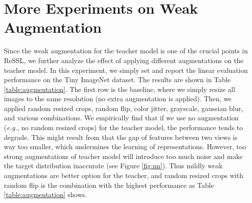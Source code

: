 \documentclass{article}
\newcommand{\<}{\left\langle}
\renewcommand{\>}{\right\rangle}
\newcommand{\eg}{{\emph{e.g.}}}
\begin{document}
\section{More Experiments on Weak Augmentation}
Since the weak augmentation for the teacher model is one of the crucial points in ReSSL, we further analyze the effect of applying different augmentations on the teacher model. In this experiment, we simply set  and report the linear evaluation performance on the Tiny ImageNet dataset.  The results are shown in Table \ref{table:augmentation}. The first row is the baseline, where we simply resize all images to the same resolution (no extra augmentation is applied). Then, we applied random resized crops, random flip, color jitter, grayscale, gaussian blur, and various combinations. We empirically find that if we use no augmentation (\eg, no random resized crops) for the teacher model, the performance tends to degrade. This might result from that the gap of features between two views is way too smaller, which undermines the learning of representations. However, too strong augmentations of teacher model will introduce too much noise and make the target distribution inaccurate (see Figure \ref{fig:nn}). Thus mildly weak augmentations are better option for the teacher, and random resized crops with random flip is the combination with the highest performance as Table \ref{table:augmentation} shows.
\end{document}
